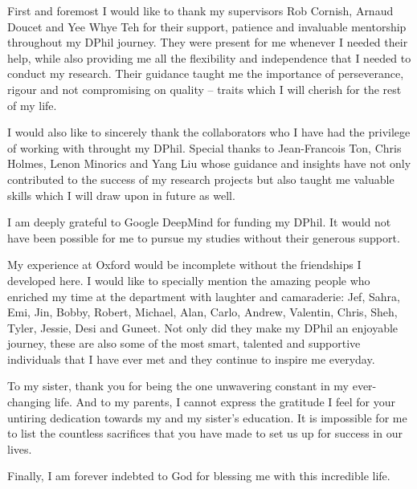 First and foremost I would like to thank my supervisors Rob Cornish, Arnaud Doucet and Yee Whye Teh 
for their support, patience and invaluable mentorship throughout my DPhil journey. 
They were present for me whenever I needed their help, while also providing me all the flexibility and independence that I needed to conduct my research. 
Their guidance taught me the importance of perseverance, rigour and not compromising on quality -- 
traits which I will cherish for the rest of my life.

I would also like to sincerely thank the collaborators who I have had the privilege of working with throught my DPhil. 
Special thanks to Jean-Francois Ton, Chris Holmes, Lenon Minorics and Yang Liu whose guidance and insights have not only contributed to the success of my research projects but also taught me valuable skills which I will draw upon in future as well.

I am deeply grateful to Google DeepMind for funding my DPhil. 
It would not have been possible for me to pursue my studies without their generous support.

My experience at Oxford would be incomplete without the friendships I developed here. 
I would like to specially mention the amazing people who enriched my time at the department with laughter and camaraderie: 
Jef, Sahra, Emi, Jin, Bobby, Robert, Michael, Alan, Carlo, Andrew, Valentin, Chris, Sheh, Tyler, Jessie, Desi and Guneet.  
Not only did they make my DPhil an enjoyable journey, these are also some of the most smart, talented and supportive individuals that I have ever met and they continue to inspire me everyday. 

To my sister, thank you for being the one unwavering constant in my ever-changing life. 
And to my parents, I cannot express the gratitude I feel for your untiring dedication towards my and my sister's education.
It is impossible for me to list the countless sacrifices that you have made to set us up for success in our lives. 

Finally, I am forever indebted to God for blessing me with this incredible life.